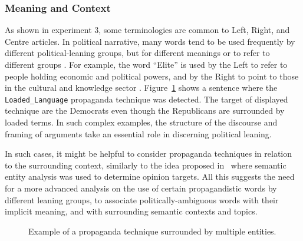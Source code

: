 \subsubsection{Meaning and Context}
As shown in experiment 3, some terminologies are common to Left, Right, and Centre articles. In political narrative, many words tend to be used frequently by different political-leaning groups, but for different meanings or to refer to different groups \citep{seargeant2020art}. For example, the word ``Elite'' is used by the Left to refer to people holding economic and political powers, and by the Right to point to those in the cultural and knowledge sector \citep{seargeant2020art}.
Figure~\ref{fig:propaganda_example_2} shows a sentence where the \texttt{Loaded\_Language} propaganda technique was detected.
The target of displayed technique are the Democrats even though the Republicans are surrounded by loaded terms.
In such complex examples, the structure of the discourse and framing of arguments take an essential role in discerning political leaning.

In such cases, it might be helpful to consider propaganda techniques in relation to the surrounding context, similarly to the idea proposed in~\citet{chen2017opinion} where semantic entity analysis was used to determine opinion targets.
All this suggests the need for a more advanced analysis on the use of certain propagandistic words by different leaning groups, to associate politically-ambiguous words with their implicit meaning, and with surrounding semantic contexts and topics.



\begin{figure}[!hbtp]
    \centering
    \vspace{-20px}
    \caption{Example of a propaganda technique surrounded by multiple entities.}
    \vspace{-8px}
    \label{fig:propaganda_example_2}
\end{figure}

